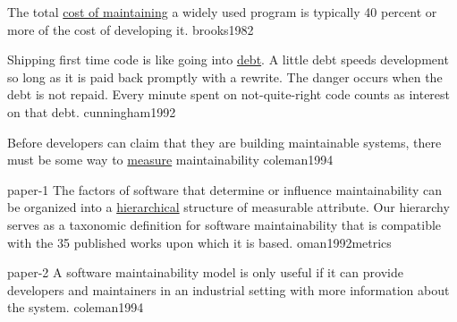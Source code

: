\documentclass{article}
\begin{document}


  {The total \ul{cost of maintaining} a widely used program is typically 40 percent or more of the cost of developing it.}
  {brooks1982}

  {Shipping first time code is like going into \ul{debt}. A little debt speeds development so long as it is paid back promptly with a rewrite. The danger occurs when the debt is not repaid. Every minute spent on not-quite-right code counts as interest on that debt.}
  {cunningham1992}

  {Before developers can claim that they are building maintainable systems, there must be some way to \ul{measure} maintainability}
  {coleman1994}

\lnQuote
  {paper-1}
  {The factors of software that determine or influence maintainability can be organized into a \ul{hierarchical} structure of measurable attribute. Our hierarchy serves as a taxonomic definition for software maintainability that is compatible with the 35 published works upon which it is based.}
  {oman1992metrics}



\lnQuote
  {paper-2}
  {A software maintainability model is only useful if it can provide developers and maintainers in an industrial setting with more information about the system.}
  {coleman1994}
\end{document}

